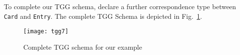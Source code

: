 To complete our TGG schema, declare a further correspondence type between \texttt{Card} and \texttt{Entry}.
The complete TGG Schema is depicted in Fig.~\ref{fig:complete_tgg_schema}.

\begin{figure}[htbp]
\begin{center}
  \texttt{[image: tgg7]}
  \caption{Complete TGG schema for our example}
  \label{fig:complete_tgg_schema}
\end{center}
\end{figure}

